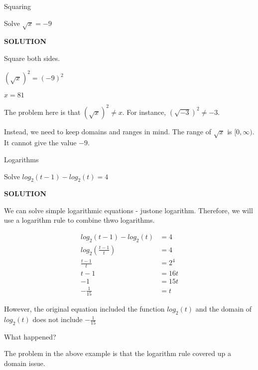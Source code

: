 \documentclass{ximera}
\begin{document}
\begin{example} Squaring


Solve $\sqrt{x} = -9$

\textbf{\textcolor{purple!50!blue!90!black}{SOLUTION}}

Square both sides.


$(\sqrt{x})^2 = (-9)^2$

$x = 81$



The problem here is that  $(\sqrt{x})^2 \ne x$.  For instance, $(\sqrt{-3})^2 \ne -3$.


Instead, we need to keep domains and ranges in mind.  The range of $\sqrt{x}$ is $[0, \infty)$. It cannot give the value $-9$.



\end{example}









\begin{example} Logarithms


Solve $log_2(t-1) - log_2(t) = 4$

\textbf{\textcolor{purple!50!blue!90!black}{SOLUTION}}


We can solve simple logarithmic equations - justone logarithm.  Therefore, we will use a logarithm rule to combine thwo logarithms.




\begin{align*}
log_2(t-1) - log_2(t) & = 4   \\
log_2 \left( \frac{t-1}{t} \right)  & = 4  \\
\frac{t-1}{t} & = 2^4  \\
 t-1 & = 16t  \\
-1 & = 15t  \\
-\frac{1}{15} & = t
\end{align*}



However, the original equation included the function $log_2(t)$ and the domain of $log_2(t)$ does not include $-\frac{1}{15}$




\end{example}


What happened?


The problem in the above example is that the logarithm rule covered up a domain issue.
\end{document}
